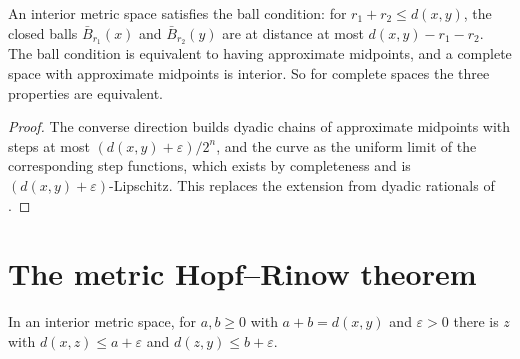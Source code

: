 \begin{theorem}
  \label{thm:ms-midpoints-iff}
  \leanok
  An interior metric space satisfies the ball condition: for $r_1 + r_2 \leq d(x, y)$, the closed
  balls $\bar B_{r_1}(x)$ and $\bar B_{r_2}(y)$ are at distance at most $d(x, y) - r_1 - r_2$. The
  ball condition is equivalent to having approximate midpoints, and a complete space with
  approximate midpoints is interior. So for complete spaces the three properties are equivalent.
\end{theorem}

\begin{proof}
  \leanok
  The converse direction builds dyadic chains of approximate midpoints with steps at most
  $(d(x, y) + \varepsilon)/2^n$, and the curve as the uniform limit of the corresponding step
  functions, which exists by completeness and is $(d(x, y) + \varepsilon)$-Lipschitz. This replaces
  the extension from dyadic rationals of \cite[Lema~8.1.9]{Lar26}.
\end{proof}

\section{The metric Hopf--Rinow theorem}
\label{sec:ms-hopf-rinow}

\begin{lemma}
  \label{lem:ms-intermediate}
  \leanok
  In an interior metric space, for $a, b \geq 0$ with $a + b = d(x, y)$ and $\varepsilon > 0$
  there is $z$ with $d(x, z) \leq a + \varepsilon$ and $d(z, y) \leq b + \varepsilon$.
\end{lemma}

